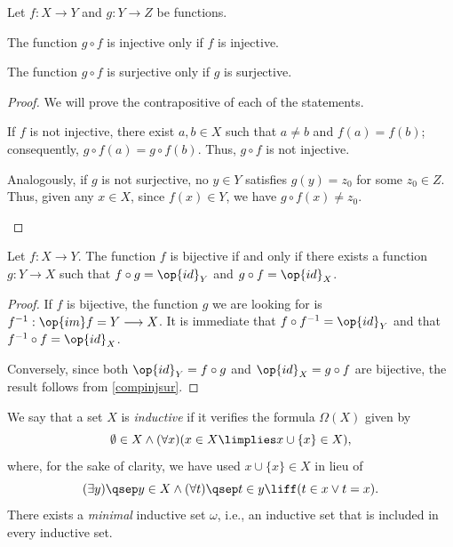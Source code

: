 \begin{proposition}
Let $f:X\longrightarrow Y$ and $g:Y\longrightarrow Z$ be functions.
\begin{statements}
\item The function $g\circ f$ is injective only if $f$ is injective.
\item The function $g\circ f$ is surjective only if $g$ is surjective.
\end{statements}
\label{compinjsur}
\end{proposition}

\begin{proof}
We will prove the contrapositive of each of the statements.

\begin{parlist}
\item If $f$ is not injective, there exist $a,b\in X$ such that $a\neq b$ and $f(a) = f(b)$; consequently, $g\circ f(a) = g \circ f(b)$. Thus, $g\circ f$ is not injective.
\item Analogously, if $g$ is not surjective, no $y\in Y$ satisfies $g(y) = z_0$ for some $z_0\in Z$. Thus, given any $x\in X$, since $f(x) \in Y$, we have $g\circ f(x) \neq z_0$.
\end{parlist}
\end{proof}

\begin{proposition}
Let $f: X\longrightarrow Y$. The function $f$ is bijective if and only if there exists a function $g:Y\longrightarrow X$ such that $f\circ g = \op{id}_Y$ and $g\circ f =\op{id}_X$.
\label{<+label+>}
\end{proposition}

\begin{proof}
If $f$ is bijective, the function $g$ we are looking for is $f^{-1} : \op{im} f = Y \longrightarrow X$. It is immediate that $f \circ f^{-1} = \op{id}_Y$ and that $f^{-1}\circ f = \op{id}_X$.

Conversely, since both $\op{id}_Y = f\circ g$ and $\op{id}_X = g\circ f$ are bijective, the result follows from \ref{compinjsur}.
\end{proof}


\begin{para}
We say that a set $X$ is \emph{inductive} if it verifies the formula $\Omega(X)$ given by
\[ \emptyset \in X \land (\forall x)(x\in X \limplies x \cup \{x\} \in X),\]
where, for the sake of clarity, we have used $x\cup\{x\}\in X$ in lieu of
\[(\exists y)\qsep y \in X \land (\forall t)\qsep t\in y\liff(t \in x \lor t = x).\]
There exists a \emph{minimal} inductive set $\omega$, i.e., an inductive set that is included in every inductive set.
\label{<+label+>}
\end{para}

